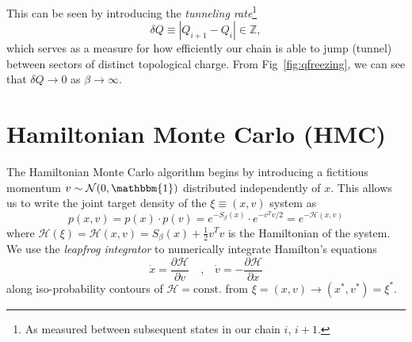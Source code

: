 \documentclass[a4paper,11pt]{article}
\begin{document}
This can be seen by introducing the \emph{tunneling rate}\footnote{As measured
between subsequent states in our chain \(i\), \(i+1\).}
%
\begin{equation}
    \delta Q \equiv \left|Q_{i+1} - Q_{i}\right| \in \mathbb{Z},
\end{equation}
%
which serves as a measure for how efficiently our chain is able to jump
(tunnel) between sectors of distinct topological charge.
%
From Fig~\ref{fig:qfreezing}, we can see that \(\delta Q\rightarrow 0\) as
\(\beta\rightarrow \infty\).
%
\section{\label{sec:hmc}Hamiltonian Monte Carlo (HMC)}
%
The Hamiltonian Monte Carlo algorithm begins by introducing a fictitious
momentum \(v \sim \mathcal{N} (0, \mathbbm{1})\) distributed independently of
\(x\).
%
This allows us to write the joint target density of the \(\xi \equiv (x, v)\)
system as
%
\begin{equation}
    p(x, v) = p(x) \cdot p(v) = e^{-S_{\beta}(x)}\cdot e^{-v^{T} v / 2} = e^{-\mathcal{H} (x, v)}
\end{equation}
%
where \(\mathcal{H}(\xi) = \mathcal{H}(x, v) = S_{\beta}(x) + \frac{1}{2} v^{T}
v\) is the Hamiltonian of the system.
%
We use the \emph{leapfrog integrator} to numerically integrate Hamilton's
equations
%
\begin{equation}
    \dot{x} = \frac{\partial \mathcal{H}}{\partial v}\quad \text{,} \quad
    \dot{v} = - \frac{\partial \mathcal{H}}{\partial x}
\end{equation}
%
along iso-probability contours of \(\mathcal{H} =\text{const.}\) from \(\xi = (x,
v)\rightarrow (x^{\ast}, v^{\ast}) = \xi^{\ast}\).
%
\end{document}

